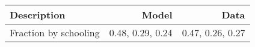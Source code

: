 \begin{tabular}{lrr}
\hline
Description & Model  & Data  \\ 
\hline
Fraction by schooling & 0.48, 0.29, 0.24  & 0.47, 0.26, 0.27  \\ 
\hline
\end{tabular}%
